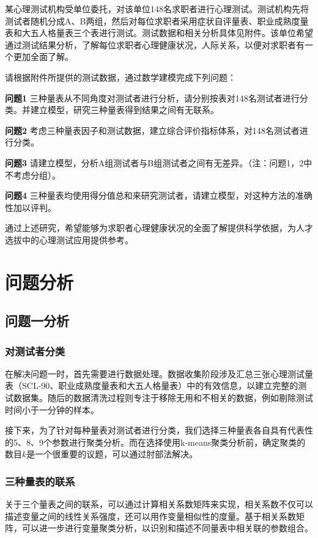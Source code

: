 \documentclass[withoutpreface,bwprint]{cumcmthesis} %
\begin{document}
某心理测试机构受单位委托，对该单位148名求职者进行心理测试。测试机构先将测试者随机分成A、B两组，然后对每位求职者采用症状自评量表、职业成熟度量表和大五人格量表三个表进行测试。测试数据和相关分析具体见附件。该单位希望通过测试结果分析，了解每位求职者心理健康状况，人际关系，以便对求职者有一个更加全面了解。

请根据附件所提供的测试数据，通过数学建模完成下列问题：

\textbf{问题1} 三种量表从不同角度对测试者进行分析，请分别按表对148名测试者进行分类。并建立模型，研究三种量表得到结果之间有无联系。

\textbf{问题2} 考虑三种量表因子和测试数据，建立综合评价指标体系，对148名测试者进行分类。

\textbf{问题3} 请建立模型，分析A组测试者与B组测试者之间有无差异。（注：问题1，2中不考虑分组）。

\textbf{问题4} 三种量表均使用得分值总和来研究测试者，请建立模型，对这种方法的准确性加以评判。


通过上述研究，希望能够为求职者心理健康状况的全面了解提供科学依据，为人才选拔中的心理测试应用提供参考。


\section{问题分析}

\subsection{问题一分析}

\subsubsection*{对测试者分类}

在解决问题一时，首先需要进行数据处理。数据收集阶段涉及汇总三张心理测试量表（SCL-90、职业成熟度量表和大五人格量表）中的有效信息，以建立完整的测试数据集。随后的数据清洗过程则专注于移除无用和不相关的数据，例如剔除测试时间小于一分钟的样本。

接下来，为了针对每种量表对测试者进行分类，我们选择三种量表各自具有代表性的5、8、9个参数进行聚类分析。而在选择使用k-means聚类分析前，确定聚类的数目$k$是一个很重要的议题，可以通过肘部法解决。


\subsubsection*{三种量表的联系}
关于三个量表之间的联系，可以通过计算相关系数矩阵来实现，相关系数不仅可以描述变量之间的线性关系强度，还可以用作变量相似性的度量。基于相关系数矩阵，可以进一步进行变量聚类分析，以识别和描述不同量表中相关联的参数组合。
\end{document}
